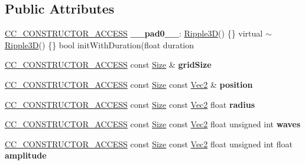 \subsection*{Public Attributes}
\begin{DoxyCompactItemize}
\item 
\mbox{\label{classRipple3D_a106dbc660c5b083e3826bb11e0493040}} 
\hyperlink{_2cocos2d_2cocos_2base_2ccConfig_8h_a25ef1314f97c35a2ed3d029b0ead6da0}{C\+C\+\_\+\+C\+O\+N\+S\+T\+R\+U\+C\+T\+O\+R\+\_\+\+A\+C\+C\+E\+SS} {\bfseries \+\_\+\+\_\+pad0\+\_\+\+\_\+}\+: \hyperlink{classRipple3D}{Ripple3D}() \{\} virtual $\sim$\hyperlink{classRipple3D}{Ripple3D}() \{\} bool init\+With\+Duration(float duration
\item 
\mbox{\label{classRipple3D_a00332c188263f2e6b261f604cc540786}} 
\hyperlink{_2cocos2d_2cocos_2base_2ccConfig_8h_a25ef1314f97c35a2ed3d029b0ead6da0}{C\+C\+\_\+\+C\+O\+N\+S\+T\+R\+U\+C\+T\+O\+R\+\_\+\+A\+C\+C\+E\+SS} const \hyperlink{classSize}{Size} \& {\bfseries grid\+Size}
\item 
\mbox{\label{classRipple3D_a394ae9beb333b60c44fc30b71052c92f}} 
\hyperlink{_2cocos2d_2cocos_2base_2ccConfig_8h_a25ef1314f97c35a2ed3d029b0ead6da0}{C\+C\+\_\+\+C\+O\+N\+S\+T\+R\+U\+C\+T\+O\+R\+\_\+\+A\+C\+C\+E\+SS} const \hyperlink{classSize}{Size} const \hyperlink{classVec2}{Vec2} \& {\bfseries position}
\item 
\mbox{\label{classRipple3D_a3e8dcb8284ad0ca48d740316a55391cd}} 
\hyperlink{_2cocos2d_2cocos_2base_2ccConfig_8h_a25ef1314f97c35a2ed3d029b0ead6da0}{C\+C\+\_\+\+C\+O\+N\+S\+T\+R\+U\+C\+T\+O\+R\+\_\+\+A\+C\+C\+E\+SS} const \hyperlink{classSize}{Size} const \hyperlink{classVec2}{Vec2} float {\bfseries radius}
\item 
\mbox{\label{classRipple3D_a1c45b0d4efe862f2ff218985df4e6839}} 
\hyperlink{_2cocos2d_2cocos_2base_2ccConfig_8h_a25ef1314f97c35a2ed3d029b0ead6da0}{C\+C\+\_\+\+C\+O\+N\+S\+T\+R\+U\+C\+T\+O\+R\+\_\+\+A\+C\+C\+E\+SS} const \hyperlink{classSize}{Size} const \hyperlink{classVec2}{Vec2} float unsigned int {\bfseries waves}
\item 
\mbox{\label{classRipple3D_a2da1ffdbd63c3fffaf1435ed2149c776}} 
\hyperlink{_2cocos2d_2cocos_2base_2ccConfig_8h_a25ef1314f97c35a2ed3d029b0ead6da0}{C\+C\+\_\+\+C\+O\+N\+S\+T\+R\+U\+C\+T\+O\+R\+\_\+\+A\+C\+C\+E\+SS} const \hyperlink{classSize}{Size} const \hyperlink{classVec2}{Vec2} float unsigned int float {\bfseries amplitude}
\end{DoxyCompactItemize}
